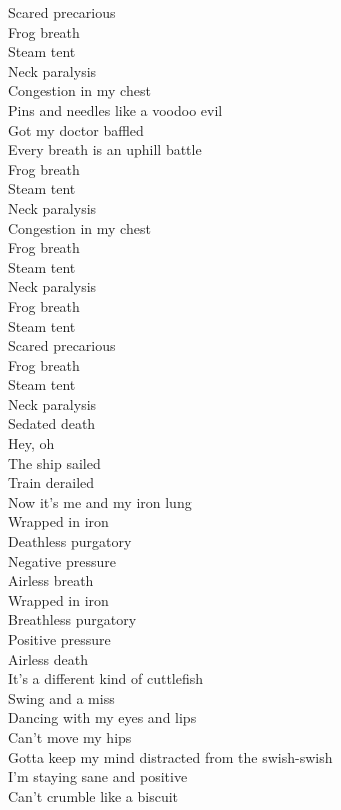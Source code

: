 Scared precarious\\
Frog breath\\
Steam tent\\
Neck paralysis\\
Congestion in my chest\\
Pins and needles like a voodoo evil\\
Got my doctor baffled\\
Every breath is an uphill battle\\
Frog breath\\
Steam tent\\
Neck paralysis\\
Congestion in my chest\\

Frog breath\\
Steam tent\\
Neck paralysis\\
Frog breath\\
Steam tent\\
Scared precarious\\
Frog breath\\
Steam tent\\
Neck paralysis\\
Sedated death\\

Hey, oh\\
The ship sailed\\
Train derailed\\
Now it's me and my iron lung\\
Wrapped in iron\\
Deathless purgatory\\
Negative pressure\\
Airless breath\\
Wrapped in iron\\
Breathless purgatory\\
Positive pressure\\
Airless death\\

It's a different kind of cuttlefish\\
Swing and a miss\\
Dancing with my eyes and lips\\
Can't move my hips\\
Gotta keep my mind distracted from the swish-swish\\
I'm staying sane and positive\\
Can't crumble like a biscuit\\

